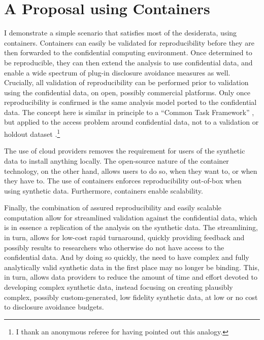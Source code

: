 \documentclass[inline]{hdsr}
\begin{document}
\section{A Proposal using Containers}
\label{sec:proposal}
I demonstrate a simple scenario that satisfies most of the desiderata,  using containers.  Containers can easily be validated for reproducibility before they are then forwarded to the confidential computing environment. Once determined to be reproducible, they can then extend the analysis to use confidential data, and enable a wide spectrum of plug-in disclosure avoidance measures as well. Crucially, all validation of reproducibility can be performed prior to validation using the confidential data, on open, possibly commercial platforms. Only once reproducibility is confirmed is the same analysis model ported to the confidential data. The concept here is similar in principle to a ``Common Task Framework'' \citep{liberman_obituary_2010,liberman_reproducible_2014,liu_successes_2019}, but applied to the access problem around confidential data, not to a validation or holdout dataset \citep{liu_successes_2019,donoho_data_2024}.\footnote{I thank an anonymous referee for having pointed out this analogy.}  

The use of cloud providers removes the requirement for users of the synthetic data to install anything locally. The open-source nature of the container technology, on the other hand, allows users to do so, when they want to, or when they have to. The use of containers enforces reproducibility out-of-box when using synthetic data. Furthermore, containers enable scalability. 

Finally, the combination of assured reproducibility and easily scalable computation allow for streamlined validation against the confidential data, which is in essence a replication of the analysis on the synthetic data. The streamlining, in turn, allows for low-cost rapid turnaround, quickly providing feedback and possibly results to researchers who otherwise do not have access to the confidential data. And by doing so quickly, the need to have complex and fully analytically valid synthetic data in the first place may no longer be binding. This, in turn, allows data providers to reduce the amount of time and effort devoted to developing complex synthetic data, instead focusing on creating plausibly complex, possibly custom-generated, low fidelity synthetic data, at low or no cost to disclosure avoidance budgets.
\end{document}
